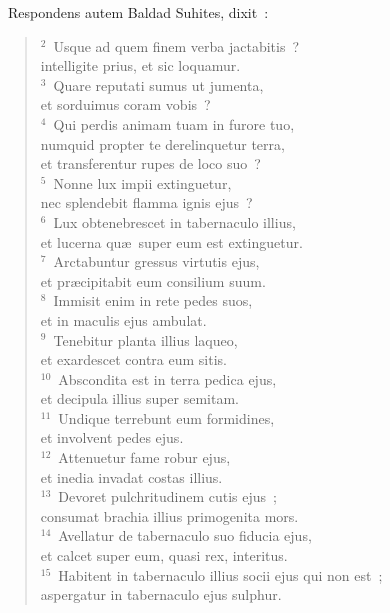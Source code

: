 ~\lettrine[lines=10,image=true,loversize=0.05,lraise=-0.03]{R}{}espondens autem Baldad Suhites, dixit~:
\begin{flushleft}\begin{verse}\vspace{6pt}${}^{2}$~Usque ad quem finem verba jactabitis~?\\ intelligite prius, et sic loquamur.\\
${}^{3}$~Quare reputati sumus ut jumenta,\\ et sorduimus coram vobis~?\\
${}^{4}$~Qui perdis animam tuam in furore tuo,\\ numquid propter te derelinquetur terra,\\ et transferentur rupes de loco suo~?\\
${}^{5}$~Nonne lux impii extinguetur,\\ nec splendebit flamma ignis ejus~?\\
${}^{6}$~Lux obtenebrescet in tabernaculo illius,\\ et lucerna qu\ae\ super eum est extinguetur.\\
${}^{7}$~Arctabuntur gressus virtutis ejus,\\ et pr\ae cipitabit eum consilium suum.\\
${}^{8}$~Immisit enim in rete pedes suos,\\ et in maculis ejus ambulat.\\
${}^{9}$~Tenebitur planta illius laqueo,\\ et exardescet contra eum sitis.\\
${}^{10}$~Abscondita est in terra pedica ejus,\\ et decipula illius super semitam.\\
${}^{11}$~Undique terrebunt eum formidines,\\ et involvent pedes ejus.\\
${}^{12}$~Attenuetur fame robur ejus,\\ et inedia invadat costas illius.\\
${}^{13}$~Devoret pulchritudinem cutis ejus~;\\ consumat brachia illius primogenita mors.\\
${}^{14}$~Avellatur de tabernaculo suo fiducia ejus,\\ et calcet super eum, quasi rex, interitus.\\
${}^{15}$~Habitent in tabernaculo illius socii ejus qui non est~;\\ aspergatur in tabernaculo ejus sulphur.\\

\end{verse}
\end{flushleft}
